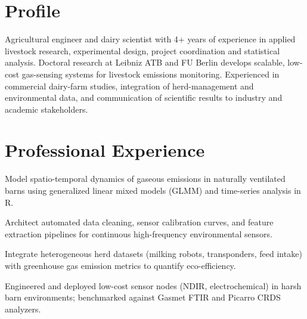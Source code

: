 \documentclass[10pt,a4paper]{article}
\begin{document}

\section*{Profile}
Agricultural engineer and dairy scientist with 4+ years of experience in applied livestock research, experimental design, project coordination and statistical analysis. Doctoral research at Leibniz ATB and FU Berlin develops scalable, low-cost gas-sensing systems for livestock emissions monitoring. Experienced in commercial dairy-farm studies, integration of herd-management and environmental data, and communication of scientific results to industry and academic stakeholders.

\section*{Professional Experience}

\begin{cvitems}

  \item Model spatio-temporal dynamics of gaseous emissions in naturally ventilated barns using generalized linear mixed models (GLMM) and time-series analysis in R.

  \item Architect automated data cleaning, sensor calibration curves, and feature extraction pipelines for continuous high-frequency environmental sensors.

  \item Integrate heterogeneous herd datasets (milking robots, transponders, feed intake) with greenhouse gas emission metrics to quantify eco-efficiency.

  \item Engineered and deployed low-cost sensor nodes (NDIR, electrochemical) in harsh barn environments; benchmarked against Gasmet FTIR and Picarro CRDS analyzers.

\end{cvitems}
\vspace{2pt}
\end{document}
